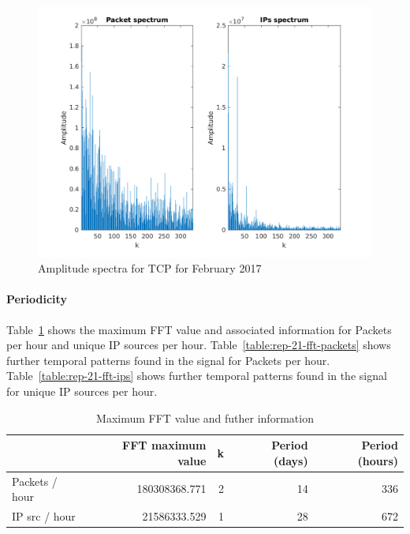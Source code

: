 \documentclass{article}
\begin{document}
\begin{figure}[h]
    \centering
    \includegraphics[width=\textwidth]{../exercise-3/plots/rep_21_b}
    \caption{\label{figure:rep-21-fft} Amplitude spectra for TCP for February 2017}
\end{figure}

\paragraph{Periodicity}
Table~\ref{table:rep-21-max-fft} shows the maximum FFT value and associated information for Packets
per hour and unique IP sources per hour.
Table~\ref{table:rep-21-fft-packets} shows further temporal patterns found in the signal for Packets
per hour.
Table~\ref{table:rep-21-fft-ips} shows further temporal patterns found in the signal for unique IP
sources per hour.

\begin{table}[h]
    \centering
    \begin{tabular}{l|r|r|r|r}
                       & FFT maximum value & k & Period (days) & Period (hours) \\
        \hline
        Packets / hour & 180308368.771 & 2 & 14 & 336 \\
        IP src / hour & 21586333.529 & 1 & 28 & 672 \\
    \end{tabular}
    \caption{\label{table:rep-21-max-fft} Maximum FFT value and futher information}
\end{table}
\end{document}
